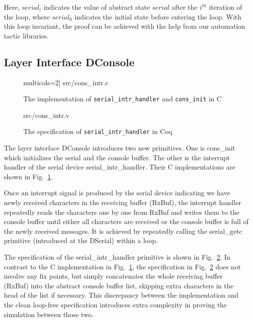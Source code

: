 Here, $serial_i$ indicates the value of abstract state $serial$ after the
$i^{th}$ iteration of the loop, where $serial_0$ indicates the initial state
before entering the loop.
With this loop invariant, the proof can be achieved with the help from
our automation tactic libraries.




\subsection{Layer Interface DConsole}

\begin{figure}
	 multicols=2] {src/cons_intr.c}
	\caption{The implementation of \texttt{serial\_intr\_handler} and \texttt{cons\_init} in C}
	\label{fig:console_c}
\end{figure}

\begin{figure}
	 {src/cons_intr.v}
	\caption{The specification of \texttt{serial\_intr\_handler} in Coq}
	\label{fig:cons_intr_v}
\end{figure}

The layer interface DConsole introduces two new primitives. One is
\textsf{cons\_init} which initializes the serial and the console buffer. The
other is the interrupt handler of the serial device
\textsf{serial\_intr\_handler}. Their C implementations are shown in
Fig.~\ref{fig:console_c}.

Once an interrupt signal is produced by the serial device indicating we have
newly received characters in the receiving buffer (RxBuf), the interrupt handler
repeatedly reads the characters one by one from RxBuf and writes them to the
console buffer until either all characters are received or the console buffer is
full of the newly received messages. It is achieved by repeatedly calling the
\textsf{serial\_getc} primitive (introduced at the DSerial) within a loop.

The specification of the \textsf{serial\_intr\_handler} primitive is shown in
Fig.~\ref{fig:cons_intr_v}. In contrast to the C implementation in
Fig.~\ref{fig:console_c}, the specification in Fig.~\ref{fig:cons_intr_v} does
not involve any fix points, but simply concatenates the whole receiving buffer
(RxBuf) into the abstract console buffer list, skipping extra characters in the
head of the list if necessary. This discrepancy between the implementation and
the clean loop-free specification introduces extra complexity in proving the
simulation between those two.


